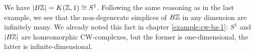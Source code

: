 \begin{example}\label{example:cw-bz-2}
We have $|B{\mathbb Z}|=K({\mathbb Z},1)\cong S^1$. Following the same reasoning as in the last example, we see that the non-degenerate simplices of $B{\mathbb Z}$ in any dimension are infinitely many. We already noted this fact in chapter \ref{example:cw-bz-1}: $S^1$ and $|B{\mathbb Z}|$ are homeomorphic CW-complexes, but the former is one-dimensional, the latter is infinite-dimensional.
\end{example}
